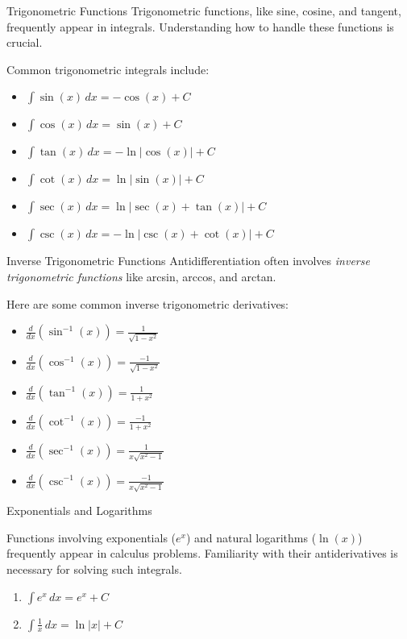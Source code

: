\documentclass[12pt]{article}
\theoremstyle{beautifulthm}
\begin{document}
\newpage
\begin{mytheorem}{Trigonometric Functions}{}
    Trigonometric functions, like sine, cosine, and tangent, frequently appear in integrals. Understanding how to handle these functions is crucial. 

Common trigonometric integrals include:
\begin{itemize}
    \item \(\int \sin(x) \, dx = -\cos(x) + C\)
    \item \(\int \cos(x) \, dx = \sin(x) + C\)
    \item \(\int \tan(x) \, dx = -\ln|\cos(x)| + C\)
    \item \(\int \cot(x) \, dx = \ln|\sin(x)| + C\)
    \item \(\int \sec(x) \, dx = \ln|\sec(x) + \tan(x)| + C\)
    \item \(\int \csc(x) \, dx = -\ln|\csc(x) + \cot(x)| + C\)
\end{itemize}
\end{mytheorem}



\begin{mytheorem}{Inverse Trigonometric Functions}{}
Antidifferentiation often involves \textit{inverse trigonometric functions} like arcsin, arccos, and arctan. 

Here are some common inverse trigonometric derivatives:
\begin{itemize}
    \item \(\frac{d}{dx} \left( \sin^{-1}(x) \right) = \frac{1}{\sqrt{1-x^2}}\)
    \item \(\frac{d}{dx} \left( \cos^{-1}(x) \right) = \frac{-1}{\sqrt{1-x^2}}\)
    \item \(\frac{d}{dx} \left( \tan^{-1}(x) \right) = \frac{1}{1+x^2}\)
    \item \(\frac{d}{dx} \left( \cot^{-1}(x) \right) = \frac{-1}{1+x^2}\)
    \item \(\frac{d}{dx} \left( \sec^{-1}(x) \right) = \frac{1}{x\sqrt{x^2-1}}\)
    \item \(\frac{d}{dx} \left( \csc^{-1}(x) \right) = \frac{-1}{x\sqrt{x^2-1}}\)
\end{itemize}
\end{mytheorem}

\begin{mytheorem}{Exponentials and Logarithms}{}

Functions involving exponentials ($e^x$) and natural logarithms ($\ln(x)$) frequently appear in calculus problems. Familiarity with their antiderivatives is necessary for solving such integrals.

\begin{enumerate}
    \item \(\int e^x \, dx = e^x + C\)
    \item \(\int \frac{1}{x} \, dx = \ln|x| + C\)
\end{enumerate}

\end{mytheorem}
\end{document}
